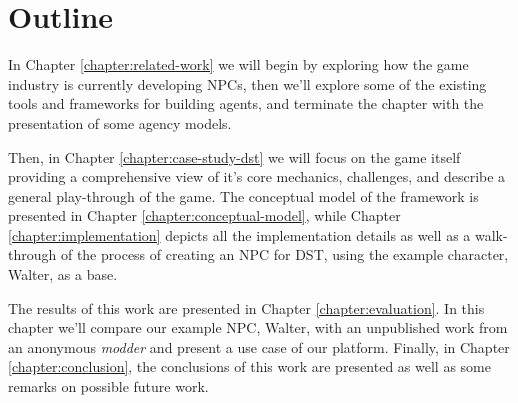 \section{Outline}

\noindent In Chapter \ref{chapter:related-work} we will begin by exploring how the game industry is currently developing \acp{NPC}, then we'll explore some of the existing tools and frameworks for building agents, and terminate the chapter with the presentation of some agency models.

Then, in Chapter \ref{chapter:case-study-dst} we will focus on the game itself providing a comprehensive view of it's core mechanics, challenges, and describe a general play-through of the game.
The conceptual model of the framework is presented in Chapter \ref{chapter:conceptual-model}, while Chapter \ref{chapter:implementation} depicts all the implementation details as well as a walk-through of the process of creating an \ac{NPC} for \ac{DST}, using the example character, Walter, as a base.

The results of this work are presented in Chapter \ref{chapter:evaluation}. In this chapter we'll compare our example \ac{NPC}, Walter, with an unpublished work from an anonymous \textit{modder} and present a use case of our platform.
Finally, in Chapter \ref{chapter:conclusion}, the conclusions of this work are presented as well as some remarks on possible future work.